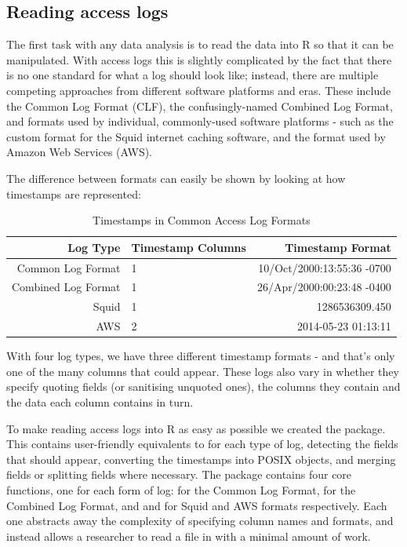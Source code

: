 \subsection{Reading access logs}\label{reading-access-logs}

The first task with any data analysis is to read the data into R so that
it can be manipulated. With access logs this is slightly complicated by
the fact that there is no one standard for what a log should look like;
instead, there are multiple competing approaches from different software
platforms and eras. These include the Common Log Format (CLF), the
confusingly-named Combined Log Format, and formats used by individual,
commonly-used software platforms - such as the custom format for the
Squid internet caching software, and the format used by Amazon Web
Services (AWS).

The difference between formats can easily be shown by looking at how
timestamps are represented:

\begin{table}[ht]
\centering
\caption{Timestamps in Common Access Log Formats}
\begin{tabular}{rlr}
  \hline
Log Type & Timestamp Columns & Timestamp Format \\ 
  \hline
Common Log Format & 1 & 10/Oct/2000:13:55:36 -0700\\ 
Combined Log Format & 1 & 26/Apr/2000:00:23:48 -0400\\ 
Squid & 1 & 1286536309.450\\ 
AWS & 2 & 2014-05-23    01:13:11\\ 
   \hline
\end{tabular}
\end{table}

With four log types, we have three different timestamp formats - and
that's only one of the many columns that could appear. These logs also
vary in whether they specify quoting fields (or sanitising unquoted
ones), the columns they contain and the data each column contains in
turn.

To make reading access logs into R as easy as possible we created the
 \citep{webreadr} package. This contains user-friendly
equivalents to  for each type of log, detecting the
fields that should appear, converting the timestamps into POSIX objects,
and merging fields or splitting fields where necessary. The package
contains four core functions, one for each form of log: 
for the Common Log Format,  for the Combined Log
Format, and  and  for Squid and AWS
formats respectively. Each one abstracts away the complexity of
specifying column names and formats, and instead allows a researcher to
read a file in with a minimal amount of work.

